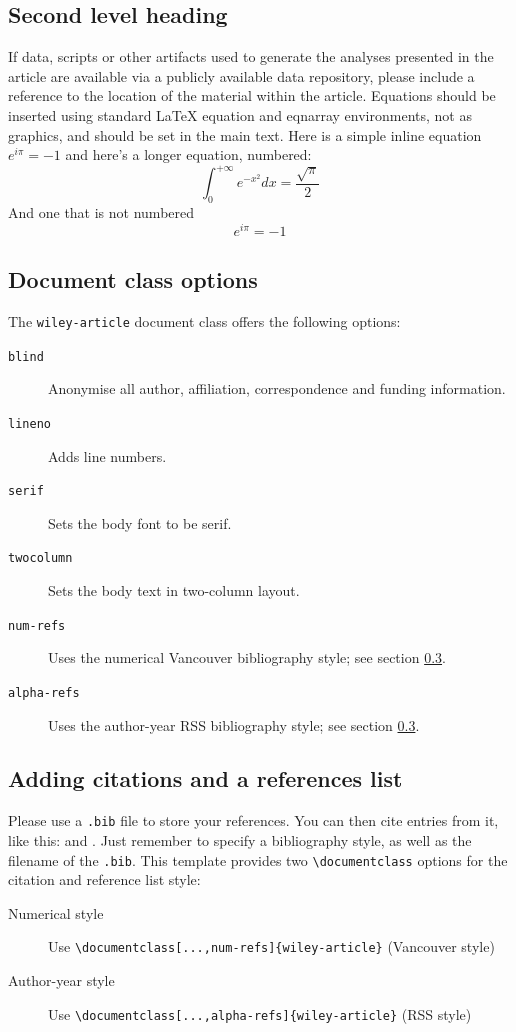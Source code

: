 \documentclass{wiley-article} %
\begin{document}
\subsection{Second level heading}
If data, scripts or other artifacts used to generate the analyses presented in the article are available via a publicly available data repository, please include a reference to the location of the material within the article. Equations should be inserted using standard LaTeX equation and eqnarray environments, not as graphics, and should be set in the main text. Here is a simple inline equation $e^{i\pi}=-1$ and here's a longer equation, numbered:
\begin{equation}
	\label{eqn:some}
	\int_0^{+\infty}e^{-x^2}dx=\frac{\sqrt{\pi}}{2}
\end{equation}
And one that is not numbered
\begin{equation*}
e^{i\pi}=-1
\end{equation*}

\subsection{Document class options}
The \texttt{wiley-article} document class offers the following options:
%
\begin{description}
\item[\texttt{blind}] Anonymise all author, affiliation, correspondence
       and funding information.
\item[\texttt{lineno}] Adds line numbers.
\item[\texttt{serif}] Sets the body font to be serif.
\item[\texttt{twocolumn}] Sets the body text in two-column layout.
\item[\texttt{num-refs}] Uses the numerical Vancouver bibliography style; see section \ref{sec:bibstyles}.
\item[\texttt{alpha-refs}] Uses the author-year RSS bibliography style; see section \ref{sec:bibstyles}.
\end{description}

\subsection{Adding citations and a references list}\label{sec:bibstyles}
Please use a \verb|.bib| file to store your references. You can then cite entries from it, like this: \cite{urmson2008autonomous,lees2010theoretical} and \cite{geiger2012we}. Just remember to specify a bibliography style, as well as the filename of the \verb|.bib|. This template provides two \verb|\documentclass| options for the citation and reference list style: 
\begin{description}
\item[Numerical style] Use \verb|\documentclass[...,num-refs]{wiley-article}| (Vancouver style)
\item[Author-year style] Use \verb|\documentclass[...,alpha-refs]{wiley-article}| (RSS style)
\end{description}
\end{document}
